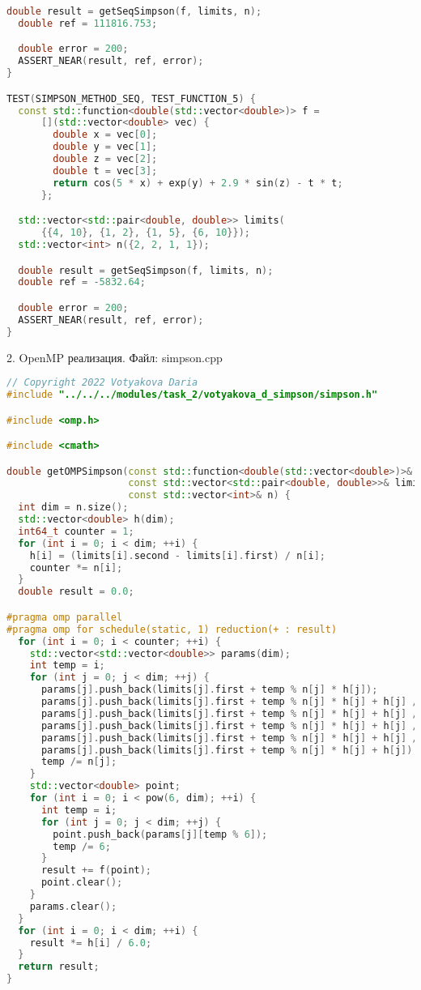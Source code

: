\documentclass{report}
\begin{document}
\begin{lstlisting}[language=C++]
  double result = getSeqSimpson(f, limits, n);
  double ref = 111816.753;

  double error = 200;
  ASSERT_NEAR(result, ref, error);
}

TEST(SIMPSON_METHOD_SEQ, TEST_FUNCTION_5) {
  const std::function<double(std::vector<double>)> f =
      [](std::vector<double> vec) {
        double x = vec[0];
        double y = vec[1];
        double z = vec[2];
        double t = vec[3];
        return cos(5 * x) + exp(y) + 2.9 * sin(z) - t * t;
      };

  std::vector<std::pair<double, double>> limits(
      {{4, 10}, {1, 2}, {1, 5}, {6, 10}});
  std::vector<int> n({2, 2, 1, 1});

  double result = getSeqSimpson(f, limits, n);
  double ref = -5832.64;

  double error = 200;
  ASSERT_NEAR(result, ref, error);
}
\end{lstlisting}

\par 2. OpenMP реализация. Файл: simpson.cpp

\begin{lstlisting}[language=C++]
// Copyright 2022 Votyakova Daria
#include "../../../modules/task_2/votyakova_d_simpson/simpson.h"

#include <omp.h>

#include <cmath>

double getOMPSimpson(const std::function<double(std::vector<double>)>& f,
                     const std::vector<std::pair<double, double>>& limits,
                     const std::vector<int>& n) {
  int dim = n.size();
  std::vector<double> h(dim);
  int64_t counter = 1;
  for (int i = 0; i < dim; ++i) {
    h[i] = (limits[i].second - limits[i].first) / n[i];
    counter *= n[i];
  }
  double result = 0.0;

#pragma omp parallel
#pragma omp for schedule(static, 1) reduction(+ : result)
  for (int i = 0; i < counter; ++i) {
    std::vector<std::vector<double>> params(dim);
    int temp = i;
    for (int j = 0; j < dim; ++j) {
      params[j].push_back(limits[j].first + temp % n[j] * h[j]);
      params[j].push_back(limits[j].first + temp % n[j] * h[j] + h[j] / 2);
      params[j].push_back(limits[j].first + temp % n[j] * h[j] + h[j] / 2);
      params[j].push_back(limits[j].first + temp % n[j] * h[j] + h[j] / 2);
      params[j].push_back(limits[j].first + temp % n[j] * h[j] + h[j] / 2);
      params[j].push_back(limits[j].first + temp % n[j] * h[j] + h[j]);
      temp /= n[j];
    }
    std::vector<double> point;
    for (int i = 0; i < pow(6, dim); ++i) {
      int temp = i;
      for (int j = 0; j < dim; ++j) {
        point.push_back(params[j][temp % 6]);
        temp /= 6;
      }
      result += f(point);
      point.clear();
    }
    params.clear();
  }
  for (int i = 0; i < dim; ++i) {
    result *= h[i] / 6.0;
  }
  return result;
}
\end{lstlisting}
\end{document}
